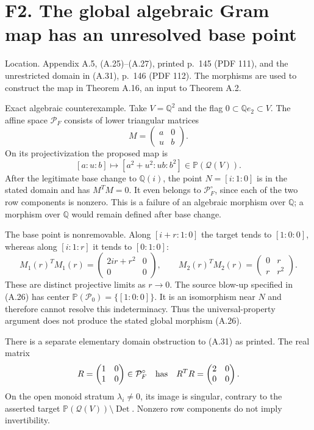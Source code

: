 \documentclass[10pt]{article}
\begin{document}
\section*{F2. The global algebraic Gram map has an unresolved base point}
Location. Appendix A.5, (A.25)–(A.27), printed p. 145 (PDF 111), and the unrestricted domain in (A.31), p. 146 (PDF 112). The morphisms are used to construct the map in Theorem A.16, an input to Theorem A.2.\par
Exact algebraic counterexample. Take \(V=\mathbb Q^2\) and the flag \(0\subset\mathbb Qe_2\subset V\). The affine space \(\mathcal P_F\) consists of lower triangular matrices \[M=\begin{pmatrix}a&0\\u&b\end{pmatrix}.\] On its projectivization the proposed map is \[[a:u:b]\longmapsto[a^2+u^2:ub:b^2]\in\mathbb P(\mathcal Q(V)).\] After the legitimate base change to \(\mathbb Q(i)\), the point \(N=[i:1:0]\) is in the stated domain and has \(M^TM=0\). It even belongs to \(\mathcal P_F^\circ\), since each of the two row components is nonzero. This is a failure of an algebraic morphism over \(\mathbb Q\); a morphism over \(\mathbb Q\) would remain defined after base change.\par
The base point is nonremovable. Along \([i+r:1:0]\) the target tends to \([1:0:0]\), whereas along \([i:1:r]\) it tends to \([0:1:0]\): \[M_1(r)^TM_1(r)=
 \begin{pmatrix}2ir+r^2&0\\0&0\end{pmatrix},\qquad
 M_2(r)^TM_2(r)=
 \begin{pmatrix}0&r\\r&r^2\end{pmatrix}.\] These are distinct projective limits as \(r\to0\). The source blow-up specified in (A.26) has center \(\mathbb P(\mathcal P_0)=\{[1:0:0]\}\). It is an isomorphism near \(N\) and therefore cannot resolve this indeterminacy. Thus the universal-property argument does not produce the stated global morphism (A.26).\par
There is a separate elementary domain obstruction to (A.31) as printed. The real matrix \[R=\begin{pmatrix}1&0\\1&0\end{pmatrix}\in\mathcal P_F^\circ
 \quad\hbox{has}\quad R^TR=\begin{pmatrix}2&0\\0&0\end{pmatrix}.\] On the open monoid stratum \(\lambda_i\ne0\), its image is singular, contrary to the asserted target \(\mathbb P(\mathcal Q(V))\setminus\operatorname{Det}\). Nonzero row components do not imply invertibility.\par
\end{document}

